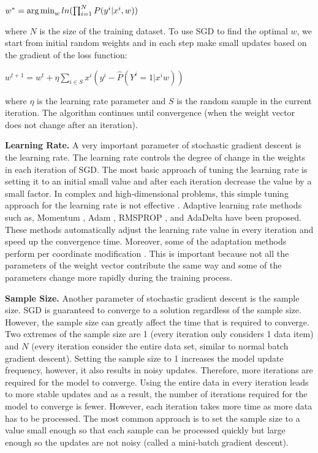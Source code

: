 \begin{center}
$w^* = \operatorname*{arg\,min}_w ln(\prod_{i=1}^{N} P(y^i | x^i, w))$
\end{center}

where $N$ is the size of the training dataset.
To use SGD to find the optimal $w$, we start from initial random weights and in each step make small updates based on the gradient of the loss function:

\begin{center}
${w}^{t+1} = {w}^t + \eta \sum_{i \in S} x^i (y^i - \hat{P}(Y^i = 1 | x^i w))$
\end{center}

where $\eta$ is the learning rate parameter and $S$ is the random sample in the current iteration.
The algorithm continues until convergence (when the weight vector does not change after an iteration).

\textbf{Learning Rate.}
A very important parameter of stochastic gradient descent is the learning rate.
The learning rate controls the degree of change in the weights in each iteration of SGD.
The most basic approach of tuning the learning rate is setting it to an initial small value and after each iteration decrease the value by a small factor.
In complex and high-dimensional problems, this simple tuning approach for the learning rate is not effective \cite{schaul2013no}. 
Adaptive learning rate methods such as, Momentum \cite{qian1999momentum}, Adam \cite{kingma2014adam}, RMSPROP \cite{tieleman2012lecture}, and AdaDelta \cite{zeiler2012adaptive} have been proposed.
These methods automatically adjust the learning rate value in every iteration and speed up the convergence time.
Moreover, some of the adaptation methods perform per coordinate modification \cite{schaul2013no, tieleman2012lecture, zeiler2012adaptive}. 
This is important because not all the parameters of the weight vector contribute the same way and some of the parameters change more rapidly during the training process.

\textbf{Sample Size.}
Another parameter of stochastic gradient descent is the sample size.
SGD is guaranteed to converge to a solution regardless of the sample size.
However, the sample size can greatly affect the time that is required to converge.
Two extremes of the sample size are 1 (every iteration only considers 1 data item) and $N$ (every iteration consider the entire data set, similar to normal batch gradient descent).
Setting the sample size to 1 increases the model update frequency, however, it also results in noisy updates.
Therefore, more iterations are required for the model to converge.
Using the entire data in every iteration leads to more stable updates and as a result, the number of iterations required for the model to converge is fewer.
However, each iteration takes more time as more data has to be processed.
The most common approach is to set the sample size to a value small enough so that each sample can be processed quickly but large enough so the updates are not noisy (called a mini-batch gradient descent).


